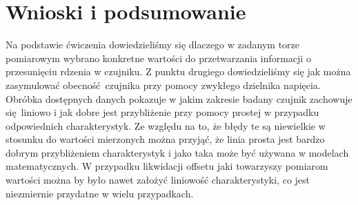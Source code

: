\documentclass[a4paper, 12pt, titlepage]{article}
\begin{document}
	\section{Wnioski i podsumowanie}
		Na podstawie ćwiczenia dowiedzieliśmy się dlaczego w zadanym torze pomiarowym wybrano konkretne wartości do przetwarzania informacji o przesunięciu rdzenia w czujniku. Z punktu drugiego dowiedzieliśmy się jak można zasymulować obecność czujnika przy pomocy zwykłego dzielnika napięcia.
		\newline \newline
		Obróbka dostępnych danych pokazuje w jakim zakresie badany czujnik zachowuje się liniowo i jak dobre jest przybliżenie przy pomocy prostej w przypadku odpowiednich charakterystyk. Ze względu na to, że błędy te są niewielkie w stosunku do wartości mierzonych można przyjąć, że linia prosta jest bardzo dobrym przybliżeniem charakterystyk i jako taka może być używana w modelach matematycznych.
		\newline \newline
		W przypadku likwidacji offsetu jaki towarzyszy pomiarom wartości można by było nawet założyć liniowość charakterystyki, co jest niezmiernie przydatne w wielu przypadkach.
\end{document}
